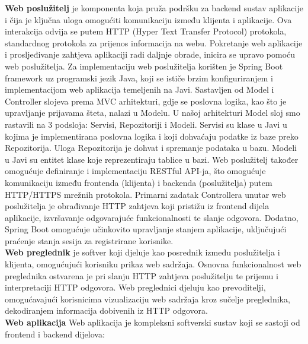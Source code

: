 \noindent\textbf{Web poslužitelj} je komponenta koja pruža podršku za backend sustav aplikacije i čija je ključna uloga omogućiti komunikaciju između klijenta i aplikacije. Ova interakcija odvija se putem HTTP (Hyper Text Transfer Protocol) protokola, standardnog protokola za prijenos informacija na webu. Pokretanje web aplikacije i prosljeđivanje zahtjeva aplikaciji radi daljnje obrade, inicira se upravo pomoću web poslužitelja. Za implementaciju web poslužitelja korišten je Spring Boot framework uz programski jezik Java, koji se ističe brzim konfiguriranjem i implementacijom web aplikacija temeljenih na Javi. Sastavljen od Model i Controller slojeva prema MVC arhitekturi, gdje se poslovna logika, kao što je upravljanje prijavama šteta, nalazi u Modelu. U našoj arhitekturi Model sloj smo rastavili na 3 podsloja: Servisi, Repozitoriji i Modeli. Servisi su klase u Javi u kojima je implementirana poslovna logika i koji dohvaćaju podatke iz baze preko Repozitorija. Uloga Repozitorija je dohvat i spremanje podataka u bazu. Modeli u Javi su entitet klase koje reprezentiraju tablice u bazi. Web poslužitelj također omogućuje definiranje i implementaciju RESTful API-ja, što omogućuje komunikaciju između frontenda (klijenta) i backenda (poslužitelja) putem HTTP/HTTPS mrežnih protokola. Primarni zadatak Controllera unutar web poslužitelja je obrađivanje HTTP zahtjeva koji pristižu iz frontend dijela aplikacije, izvršavanje odgovarajuće funkcionalnosti te slanje odgovora. Dodatno, Spring Boot omogućuje učinkovito upravljanje stanjem aplikacije, uključujući praćenje stanja sesija za registrirane korisnike.
\newline
\textbf{\\Web preglednik} je softver koji djeluje kao posrednik između poslužitelja i klijenta, omogućujući korisniku prikaz web sadržaja. Osnovna funkcionalnost web preglednika ostvarena je pri slanju HTTP zahtjeva poslužitelju te prijemu i interpretaciji HTTP odgovora. Web preglednici djeluju kao prevoditelji, omogućavajući korisnicima vizualizaciju web sadržaja kroz sučelje preglednika, dekodiranjem informacija dobivenih iz HTTP odgovora.
\newline
\textbf{\\Web aplikacija} Web aplikacija je kompleksni softverski sustav koji se sastoji od frontend i backend dijelova:
